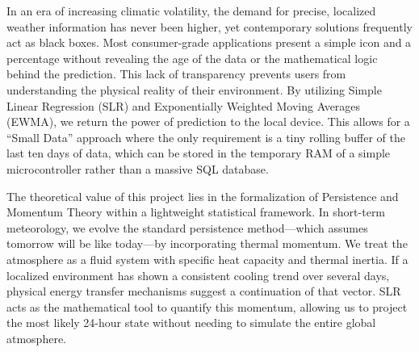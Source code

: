 \documentclass[14pt]{extarticle}
\begin{document}
\medskip

\noindent In an era of increasing climatic volatility, the demand for precise, localized weather information has never been higher, yet contemporary solutions frequently act as black boxes. Most consumer-grade applications present a simple icon and a percentage without revealing the age of the data or the mathematical logic behind the prediction. This lack of transparency prevents users from understanding the physical reality of their environment. By utilizing Simple Linear Regression (SLR) and Exponentially Weighted Moving Averages (EWMA), we return the power of prediction to the local device. This allows for a ``Small Data'' approach where the only requirement is a tiny rolling buffer of the last ten days of data, which can be stored in the temporary RAM of a simple microcontroller rather than a massive SQL database.

\medskip

\noindent The theoretical value of this project lies in the formalization of Persistence and Momentum Theory within a lightweight statistical framework. In short-term meteorology, we evolve the standard persistence method—which assumes tomorrow will be like today—by incorporating thermal momentum. We treat the atmosphere as a fluid system with specific heat capacity and thermal inertia. If a localized environment has shown a consistent cooling trend over several days, physical energy transfer mechanisms suggest a continuation of that vector. SLR acts as the mathematical tool to quantify this momentum, allowing us to project the most likely 24-hour state without needing to simulate the entire global atmosphere.

\medskip
\end{document}
